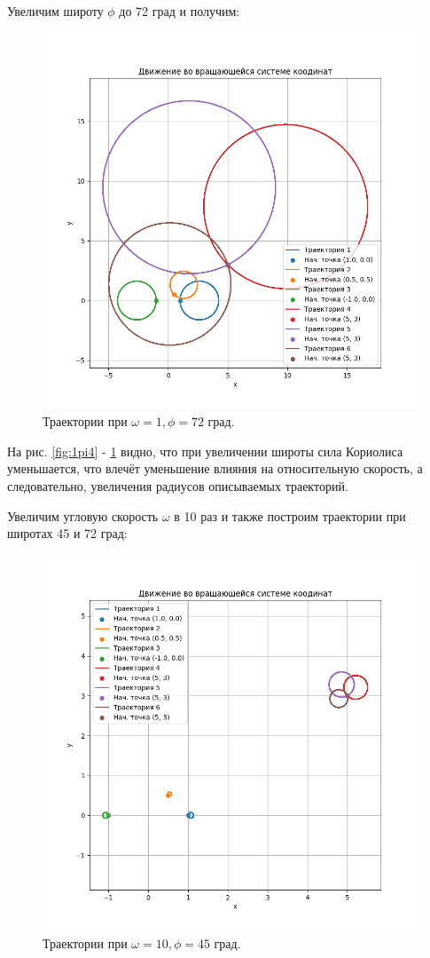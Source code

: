 Увеличим  широту $\phi$ до 72 град и получим: 
\begin{figure}[h]  %
	\centering
	\includegraphics[height=0.8\textwidth]{imgs/1pi2.5.png}  %
	\caption{Траектории при \(\omega = 1, \phi = 72\) град.}  %
	\label{fig:1pi2.5}  %
\end{figure}

На рис. \ref{fig:1pi4} - \ref{fig:1pi2.5} видно, что при увеличении широты сила Кориолиса уменьшается, что влечёт уменьшение влияния на относительную скорость, а следовательно, увеличения радиусов описываемых траекторий.

Увеличим угловую скорость $\omega$ в 10 раз и также построим траектории при широтах 45 и 72 град:
\begin{figure}[h]  %
	\centering
	\includegraphics[height=0.7\textwidth]{imgs/10pi4.png}  %
	\caption{Траектории при \(\omega = 10, \phi = 45\) град.}  %
	\label{fig:10pi4}  %
\end{figure}


